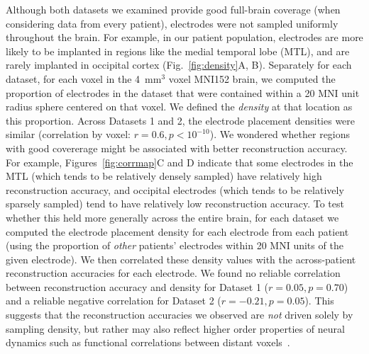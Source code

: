 \documentclass[11pt]{article}
\begin{document}
Although both datasets we examined provide good full-brain coverage (when
considering data from every patient), electrodes were not sampled uniformly
throughout the brain.  For example, in our patient population, electrodes are
more likely to be implanted in regions like the medial temporal lobe (MTL), and
are rarely implanted in occipital cortex (Fig.~\ref{fig:density}A, B).
Separately for each dataset, for each voxel in the 4~mm$^3$ voxel MNI152 brain,
we computed the proportion of electrodes in the dataset that were contained
within a 20 MNI unit radius sphere centered on that voxel.  We defined the
\textit{density} at that location as this proportion. Across Datasets 1 and 2,
the electrode placement densities were similar (correlation by voxel: $r = 0.6,
p < 10^{-10}$).  We wondered whether regions with good covererage might be
associated with better reconstruction accuracy. For example,
Figures~\ref{fig:corrmap}C and D indicate that some electrodes in the MTL (which
tends to be relatively densely sampled) have relatively high reconstruction
accuracy, and occipital electrodes (which tends to be relatively sparsely
sampled) tend to have relatively low reconstruction accuracy.  To test whether
this held more generally across the entire brain, for each dataset we computed
the electrode placement density for each electrode from each patient (using the
proportion of \textit{other} patients' electrodes within 20 MNI units of the
given electrode).  We then correlated these density values with the
across-patient reconstruction accuracies for each electrode.  We found no
reliable correlation between reconstruction accuracy and density for Dataset 1
($r = 0.05, p = 0.70$) and a reliable negative correlation for Dataset 2 ($r =
-0.21, p = 0.05$).  This suggests that the reconstruction accuracies we
observed are \textit{not} driven solely by sampling density, but rather may also
reflect higher order properties of neural dynamics such as functional
correlations between distant voxels~\citep{BetzEtal17b}.
\end{document}
